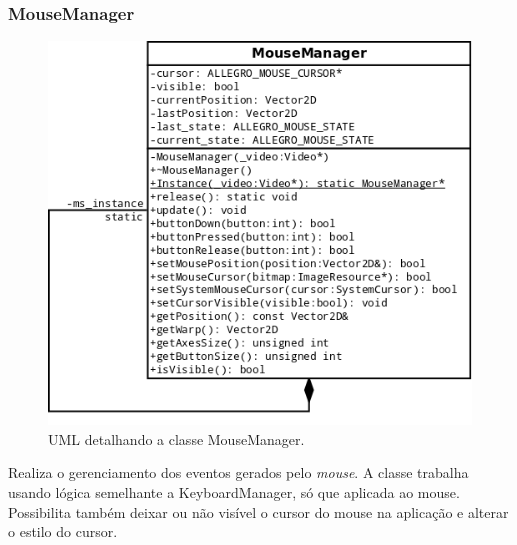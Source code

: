 \subsubsection{MouseManager}
%
%
\begin{figure}[H]
    \centering
    \includegraphics[scale = 0.50]{uml/MouseManager.png}
    \caption{UML detalhando a classe MouseManager.}
    \label{MouseManager}
\end{figure}
%
%
Realiza o gerenciamento dos eventos gerados pelo \textit{mouse}. A classe trabalha usando lógica semelhante a KeyboardManager, só que aplicada ao mouse. Possibilita também deixar ou não visível o cursor do mouse na aplicação e alterar o estilo do cursor.
%
%
